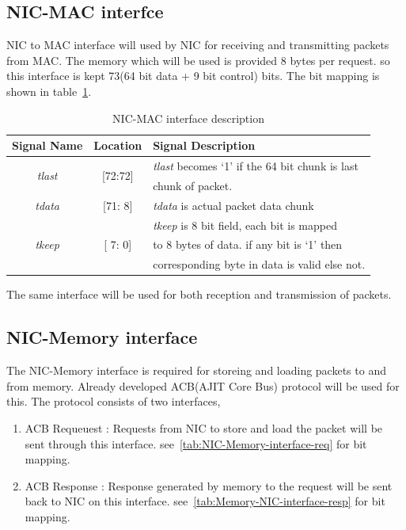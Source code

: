 \documentclass[12pt]{report}
\begin{document}
		\subsection{NIC-MAC interfce}
			NIC to MAC interface will used by NIC for receiving and transmitting packets from MAC. The memory which will be used is provided 8 bytes per request.
			so this interface is kept 73(64 bit data + 9 bit control) bits. The bit mapping is shown in table~\ref{tab:NIC-MAC-interface}.
				\begin{table}[!htbp]
					\centering
					\begin{tabular}{ccl}
						\hline
						\textbf{Signal Name} & \textbf{Location} &\textbf{Signal Description}  \\ \hline
						\multirow{2}{*}{\textit{tlast}}	& \multirow{2}{*}{[72:72]}	& \textit{tlast} becomes `1' if the 64 bit chunk is last\\
										& 				& chunk of packet.\\ \hline
						\textit{tdata}   		& [71: 8] 			& \textit{tdata} is actual packet data chunk\\ \hline
						\multirow{3}{*}{\textit{tkeep}}	& \multirow{3}{*}{[ 7: 0]}	& \textit{tkeep} is 8 bit field, each bit is mapped\\
										&				& to 8 bytes of data. if any bit is `1' then\\
										& 				& corresponding byte in data is valid else not.\\ \hline 
					\end{tabular}
					\caption{NIC-MAC interface description}
					\label{tab:NIC-MAC-interface}
				\end{table}
			The same interface will be used for both reception and transmission of packets.

		\subsection{NIC-Memory interface}
			The NIC-Memory interface is required for storeing and loading packets to and from memory. Already developed ACB(AJIT Core Bus) protocol will be used for this.
                        The protocol consists of two interfaces,
			\begin{enumerate}
				\item ACB Requeuest : Requests from NIC to store and load the packet will be sent through this interface. see~\ref{tab:NIC-Memory-interface-req} for bit mapping.
				\item ACB Response : Response generated by memory to the request will be sent back to NIC on this interface. see~\ref{tab:Memory-NIC-interface-resp} for bit mapping.
			\end{enumerate}
\end{document}
